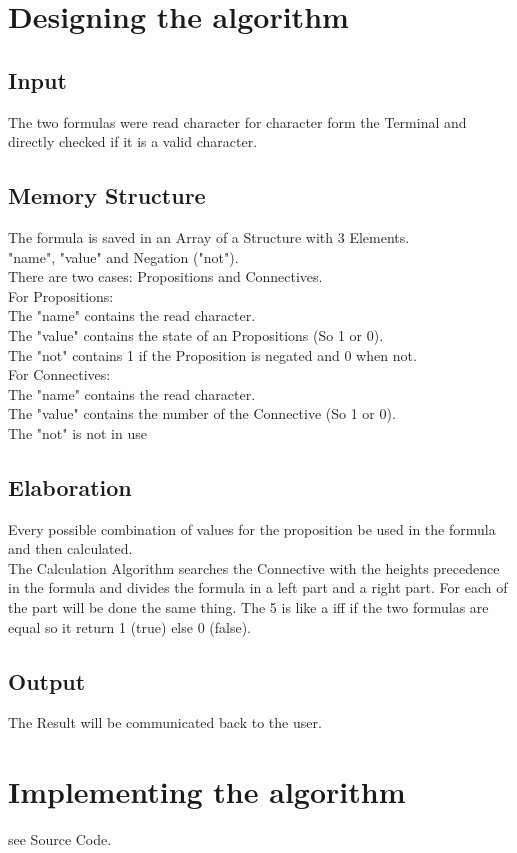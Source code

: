\documentclass[11pt, a4paper, titlepage, block]{article}
\begin{document}
	\newpage			
\section{Designing the algorithm}
	\subsection{Input}
	The two formulas were read character for character form the Terminal and directly checked if it is a valid character.
	
	\subsection{Memory Structure}
		The formula is saved in an Array of a Structure with 3 Elements.\\
		"name", "value" and Negation ("not").\\
		There are two cases: Propositions and Connectives.\\
		For Propositions:\\
		The "name" contains the read character. \\
		The "value" contains the state of an Propositions (So 1 or 0).\\
		The "not" contains 1 if the Proposition is negated and 0 when not.\\
		For Connectives:\\
		The "name" contains the read character. \\
		The "value" contains the number of the Connective  (So 1 or 0).\\
		The "not" is not in use
	\subsection{Elaboration}
	Every possible combination of values ​​for the proposition be used in the formula and then calculated.\\
	The Calculation Algorithm searches the Connective with the heights precedence in the formula and divides the formula in a left part and a right part. For each of the part will be done the same thing.
	The 5 is like a iff if the two formulas are equal so it return 1 (true) else 0 (false). 
	\subsection{Output}
	The Result will be communicated back to the user.
	\newpage
\section{Implementing the algorithm}
	see Source Code.
\end{document}
